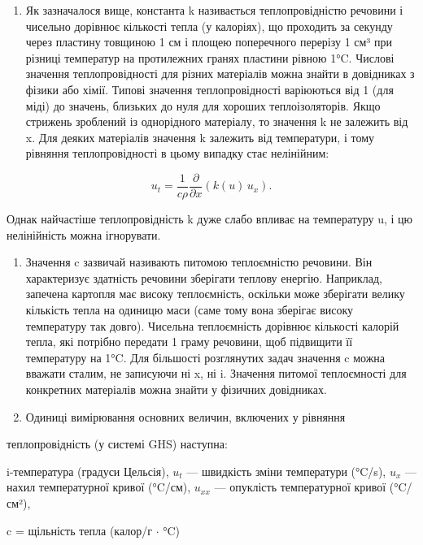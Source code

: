 \documentclass[
  ukrainian,
]{article}
\providecommand{\tightlist}{%
  \setlength{\itemsep}{0pt}\setlength{\parskip}{0pt}}
\begin{document}
\begin{enumerate}
\def\labelenumi{\arabic{enumi}.}
\tightlist
\item
  Як зазначалося вище, константа k називається теплопровідністю речовини
  і чисельно дорівнює кількості тепла (у калоріях), що проходить за
  секунду через пластину товщиною 1 см і площею поперечного перерізу 1
  см³ при різниці температур на протилежних гранях пластини рівною 1°C.
  Числові значення теплопровідності для різних матеріалів можна знайти в
  довідниках з фізики або хімії. Типові значення теплопровідності
  варіюються від 1 (для міді) до значень, близьких до нуля для хороших
  теплоізоляторів. Якщо стрижень зроблений із однорідного матеріалу, то
  значення k не залежить від x. Для деяких матеріалів значення k
  залежить від температури, і тому рівняння теплопровідності в цьому
  випадку стає нелінійним:
\end{enumerate}

\[u_{t} = \frac{1}{c\rho} \frac{\partial}{\partial x}\left(k(u)\,u_{x}\right).\]

Однак найчастіше теплопровідність k дуже слабо впливає на температуру u,
і цю нелінійність можна ігнорувати.

\begin{enumerate}
\def\labelenumi{\arabic{enumi}.}
\setcounter{enumi}{1}
\item
  Значення c зазвичай називають питомою теплоємністю речовини. Він
  характеризує здатність речовини зберігати теплову енергію. Наприклад,
  запечена картопля має високу теплоємність, оскільки може зберігати
  велику кількість тепла на одиницю маси (саме тому вона зберігає високу
  температуру так довго). Чисельна теплоємність дорівнює кількості
  калорій тепла, які потрібно передати 1 граму речовини, щоб підвищити
  її температуру на 1°C. Для більшості розглянутих задач значення c
  можна вважати сталим, не записуючи ні x, ні i. Значення питомої
  теплоємності для конкретних матеріалів можна знайти у фізичних
  довідниках.
\item
  Одиниці вимірювання основних величин, включених у рівняння
\end{enumerate}

теплопровідність (у системі GHS) наступна:

i-температура (градуси Цельсія), \(u_t\) --- швидкість зміни температури
(°C/s), \(u_x\) --- нахил температурної кривої (°C/см), \(u_{xx}\) ---
опуклість температурної кривої (°C/см²),

c = щільність тепла (калор/г \(\cdot\) °C)
\end{document}
